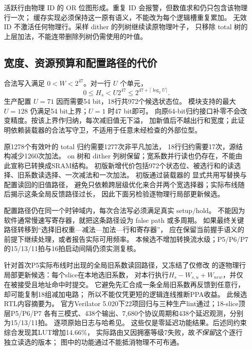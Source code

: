 活跃行由物理 ID 的 OR 位图形成。重复 ID 会报警，但数值求和仍只包含该物理行一次；
缓存实现必须保持这一原有语义，不能改为每个逻辑槽重复累加。
无效 ID 不激活任何物理行。采样 dither 的列树继续读原物理叶子，
只移除 total 树的上层加法，不能连带删除列树仍需使用的叶值。

\subsection{宽度、资源预算和配置路径的代价}
合法写入满足 \(0<W<2^{47}\)。对一行 \(U\) 个单元，
\begin{equation}
0\leq H_s < U2^{47}\leq 2^{47+\lceil\log_2 U\rceil}.
\end{equation}
生产配置 \(U=71\) 因而需要54 bit，18行共972个候选状态位。
模块支持的最大 \(U=128\) 仍满足54 bit上界；\(U=1\) 时47 bit即可。
向原64-bit归约接口补零不会改变精度。按该上界作归纳，每次减旧值无下溢，
加新值后不越出行和宽度；此证明依赖装载器的合法写守卫，不适用于任意未经检查的外部位型。

原1278个有效叶的 total 归约需要1277次非平凡加法，
18行归约需要17次，源结构减少1260次加法。
on 树和 dither 列树保留；宽系数并行读也仍存在，不能由此宣称已转换成SRAM结构。
初版新增代价包括972个状态位、被选行和的读选择、旧系数读选择、一次减法和一次加法。
初版通过装载器的  显式共用写替换与配置读回的旧值路径，
避免只依赖跨层级优化来合并两个宽选择器；实际布线随后揭示这条全局反馈路径过长，
因此下面另检验逐物理行局部更新候选。

配置路径仍在同一个时钟域内，每次合法写必须满足真实 setup/hold。
不能因为软件通常慢速写寄存器，就把这条路径设为 false path 或多周期。
如果最终关键路径转移到“选择旧权重—减法—加法—行和寄存器”，
应在保留当前握手语义的前提下继续处理，或者报告实际可用频率。
本候选不增加转换流水级；P5/P6/P7 的15/13/11拍与16拍启动间隔仍须实测复核。

针对首次P5实际布线时出现的全局旧系数读回路径，又冻结了仅修改
的逐物理行局部更新候选：每个slice在本地选旧系数，
对本行执行\(H_s-W_{s,u}+W_{new}\)，并仅在被接受且地址命中时提交。
它避免先汇合成一条全局旧系数再反馈到任意行，却可能复制18组减加电路；
所以不能仅凭更短的逻辑连线推断PPA收益。
此候选RTL内容摘要为。
官方Verilator 5.020下22项回归与三种生产lint通过；18-slice顶层P5/P6/P7
各有三模式、438个输出、7,680个协议周期和438个延迟观测，分别为15/13/11拍。
逐项原始日志与哈希见。
这些仅是零延迟功能结果。后述同约束综合发现其LUT增加14.66\%，
实际路由又因拥塞等级7失败，故\emph{不保留}这个逐行独立读选的版本；
图中的功能通过不能抵消物理不可布通。

